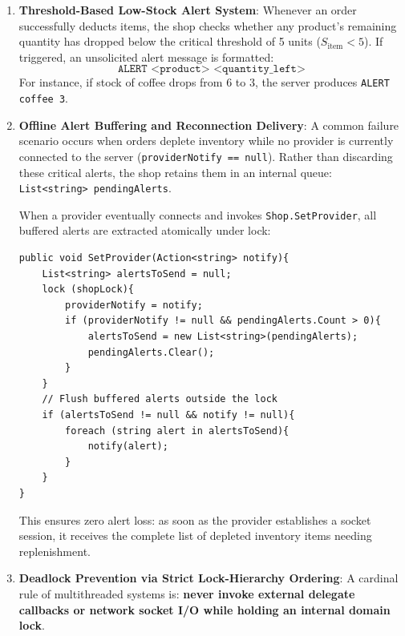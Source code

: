 \documentclass[11pt,a4paper]{article}
\begin{document}
\begin{enumerate}
    \item \textbf{Threshold-Based Low-Stock Alert System}:
    Whenever an order successfully deducts items, the shop checks whether any product's remaining quantity has dropped below the critical threshold of 5 units ($S_{\text{item}} < 5$). If triggered, an unsolicited alert message is formatted:
    $$\texttt{ALERT <product> <quantity\_left>}$$
    For instance, if stock of coffee drops from 6 to 3, the server produces \texttt{ALERT coffee 3}.

    \item \textbf{Offline Alert Buffering and Reconnection Delivery}:
    A common failure scenario occurs when orders deplete inventory while no provider is currently connected to the server (\texttt{providerNotify == null}). Rather than discarding these critical alerts, the shop retains them in an internal queue: \texttt{List<string> pendingAlerts}. 
    
    When a provider eventually connects and invokes \texttt{Shop.SetProvider}, all buffered alerts are extracted atomically under lock:
    \begin{lstlisting}[language={[Sharp]C}]
public void SetProvider(Action<string> notify){
    List<string> alertsToSend = null;
    lock (shopLock){
        providerNotify = notify;
        if (providerNotify != null && pendingAlerts.Count > 0){
            alertsToSend = new List<string>(pendingAlerts);
            pendingAlerts.Clear();
        }
    }
    // Flush buffered alerts outside the lock
    if (alertsToSend != null && notify != null){
        foreach (string alert in alertsToSend){
            notify(alert);
        }
    }
}
    \end{lstlisting}
    This ensures zero alert loss: as soon as the provider establishes a socket session, it receives the complete list of depleted inventory items needing replenishment.

    \item \textbf{Deadlock Prevention via Strict Lock-Hierarchy Ordering}:
    A cardinal rule of multithreaded systems is: \textbf{never invoke external delegate callbacks or network socket I/O while holding an internal domain lock}.
    

\end{enumerate}
\end{document}
